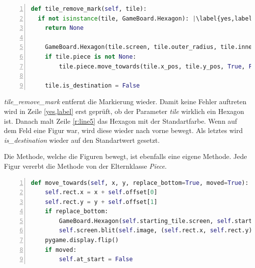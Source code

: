 \begin{lstlisting}[language=python,caption={Markierung aufheben},captionpos=b,label={lst:hexa:aufheben},numbers=left,frame=none,escapechar=|]
def tile_remove_mark(self, tile):
  if not isinstance(tile, GameBoard.Hexagon): |\label{yes,label}|
    return None

    GameBoard.Hexagon(tile.screen, tile.outer_radius, tile.inner_radius,tile.x_pos, tile.y_pos)
    if tile.piece is not None:
        tile.piece.move_towards(tile.x_pos, tile.y_pos, True, False)
        
    tile.is_destination = False
\end{lstlisting}

\textit{tile\_remove\_mark} entfernt die Markierung wieder. Damit keine Fehler auftreten wird in Zeile \ref{yes,label} erst geprüft, ob der Parameter \textit{tile} wirklich ein Hexagon ist. Danach malt Zeile \ref{r:line5} das Hexagon mit der Standartfarbe. Wenn auf dem Feld eine Figur war, wird diese wieder nach vorne bewegt. Als letztes wird \textit{is\_destination} wieder auf den Standartwert gesetzt.

Die Methode, welche die Figuren bewegt, ist ebenfalls eine eigene Methode. Jede Figur vererbt die Methode von der Elternklasse \textit{Piece}.

\begin{lstlisting}[language=python,caption={Figur bewegen},captionpos=b,label={lst:hexa:bewegen},numbers=left,frame=none,escapechar=|]
def move_towards(self, x, y, replace_bottom=True, moved=True):
    self.rect.x = x + self.offset[0]
    self.rect.y = y + self.offset[1]
    if replace_bottom:
        GameBoard.Hexagon(self.starting_tile.screen, self.starting_tile.outer_radius, self.starting_tile.inner_radius, self.starting_tile.x_pos, self.starting_tile.y_pos) 
        self.screen.blit(self.image, (self.rect.x, self.rect.y))
    pygame.display.flip()
    if moved:
        self.at_start = False

\end{lstlisting}

